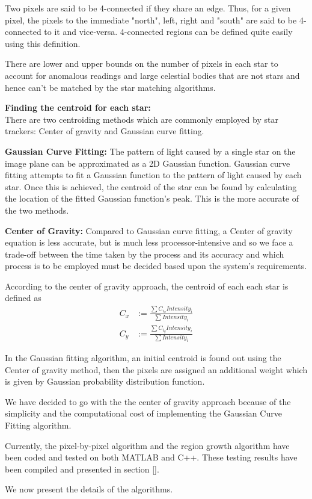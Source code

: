 Two pixels are said to be 4-connected if they share an edge. Thus, for a given pixel, the pixels to the immediate "north", left, right and "south" are said to be 4-connected to it and vice-versa. 4-connected regions can be defined quite easily using this definition.

There are lower and upper bounds on the number of pixels in each star to account for anomalous readings and large celestial bodies that are not stars and hence can't be matched by the star matching algorithms.

\large{\textbf{Finding the centroid for each star:}}\\
\normalsize
There are two centroiding methods which are commonly employed by star trackers:
Center of gravity and Gaussian curve fitting.

\textbf{Gaussian Curve Fitting:}
The pattern of light caused by a single star on the image plane can be approximated as a 2D Gaussian function. Gaussian curve fitting attempts to fit a Gaussian function to the pattern of light caused by each star. Once this is achieved, the centroid of the star can be found by calculating the location of the fitted Gaussian function's peak. This is the more accurate of the two methods.

\textbf{Center of Gravity:}
Compared to Gaussian curve fitting, a Center of gravity equation is less accurate, but is much less processor-intensive and so we face a trade-off between the time taken by the process and its accuracy and which process is to be employed must be decided based upon the system's requirements.

According to the center of gravity approach, the centroid of each each star is defined as
\begin{align}
    C_{x} & := \frac{\sum C_{i_{x}}Intensity_{i}}{\sum Intensity_{i}}\\
    C_{y} & := \frac{\sum C_{i_{y}}Intensity_{i}}{\sum Intensity_{i}}
\end{align}

In the Gaussian fitting algorithm, an initial centroid is found out using the Center of gravity method, then the pixels are assigned an additional weight which is given by Gaussian probability distribution function.

We have decided to go with the the center of gravity approach because of the simplicity and the computational cost of implementing the Gaussian Curve Fitting algorithm.

Currently, the pixel-by-pixel algorithm and the region growth algorithm have been coded and tested on both MATLAB and C++. These testing results have been compiled and presented in section \ref{}. %

We now present the details of the algorithms.

\newpage
